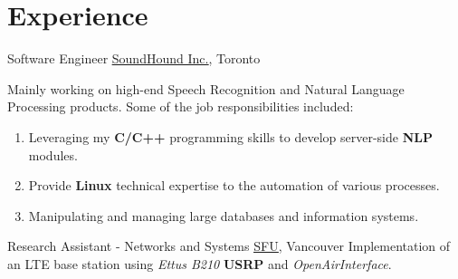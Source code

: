 \documentclass[letterpaper]{twentysecondcv} %
\newcommand{\myhy}[2]{\underline{\href{#1}{#2}}}
\begin{document}

\section{Experience}

\begin{twenty}

             {Software Engineer}
             {\myhy{https://soundhound.com/}{SoundHound Inc.}, Toronto}
             {Mainly working on high-end Speech Recognition and Natural Language Processing products. Some of the job responsibilities included:
             \begin{enumerate}
                 \item{Leveraging my \textbf{C/C++} programming skills to develop server-side \textbf{NLP} modules.}
                 \item{Provide \textbf{Linux} technical expertise to the automation of various processes.}
                 \item{Manipulating and managing large databases and information systems.}
             \end{enumerate}
             }

               {Research Assistant - Networks and Systems}
               {\myhy{https://www.sfu.ca/computing/research/labs/nsl.html}{SFU}, Vancouver}
               {Implementation of an LTE base station using \textit{Ettus B210} \textbf{USRP} and \textit{OpenAirInterface}.
               }


\end{twenty}
\end{document}
